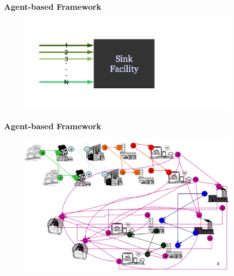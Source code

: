 \begin{frame}
	\frametitle{Agent-based Framework}
	\begin{figure}[htbp!]
        \begin{center}
                \includegraphics[width=\textwidth]{./images/sink.png}
        \end{center}
	\end{figure}
\end{frame}

\begin{frame}
	\frametitle{Agent-based Framework}
	\begin{figure}[htbp!]
        \begin{center}
                \includegraphics[width=\textwidth]{./images/flow.png}
        \end{center}
	\end{figure}
\end{frame}


